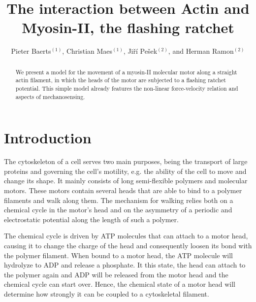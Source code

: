 \documentclass[aps,pre,onecolumn,showpacs,showkeys,a4paper]{revtex4}
\begin{document}
 

\title{The interaction between Actin and Myosin-II, the flashing ratchet}
\author{Pieter Baerts$^{(1)}$, Christian Maes$^{(1)}$, Jiří Pešek$^{(2)}$, and Herman Ramon$^{(2)}$}
\begin{abstract}
We present a model for the movement of a myosin-II molecular motor along a straight actin filament, in which the heads of the motor are subjected to a flashing ratchet potential. This simple model already features the non-linear force-velocity relation and aspects of mechanosensing. 
\end{abstract}

\maketitle 

\section{Introduction}

The cytoskeleton of a cell serves two main purposes, being the transport of large proteins and governing the cell's motility, e.g. the ability of the cell to move and change its shape. 
It mainly consists of long semi-flexible polymers and molecular motors. 
These motors contain several heads that are able to bind to a polymer filaments and walk along them. 
The mechanism for walking relies both on a chemical cycle in the motor's head and on the asymmetry of a periodic and electrostatic potential along the length of such a polymer.

The chemical cycle is driven by ATP molecules that can attach to a motor head, causing it to change the charge of the head and consequently loosen its bond with the polymer filament. 
When bound to a motor head, the ATP molecule will hydrolyze to ADP and release a phosphate. 
It this state, the head can attach to the polymer again and ADP will be released from the motor head and the chemical cycle can start over. 
Hence, the chemical state of a motor head will determine how strongly it can be coupled to a cytoskeletal filament. 
\end{document}
